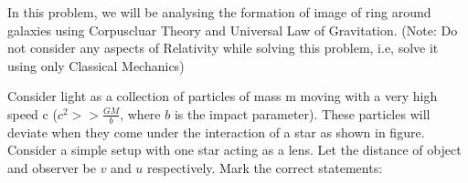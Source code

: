\documentclass[11pt,a4paper]{scrartcl}
\begin{document}
\begin{problem}

In this problem, we will be analysing the formation of image of ring around galaxies using Corpuscluar Theory and Universal Law of Gravitation. (Note: Do not consider any aspects of Relativity while solving this problem, i.e, solve it using only Classical Mechanics) 

\vspace{3mm}

Consider light as a collection of particles of mass m moving with a very high speed c ($c^2>>\frac{GM}{b}$, where $b$ is the impact parameter). These particles will deviate when they come under the interaction of a star as shown in figure. Consider a simple setup with one star acting as a lens. Let the distance of object and observer be $v$ and $u$ respectively. Mark the correct statements:


\begin{center}

\begin{tikzpicture}[x=0.75pt,y=0.75pt,yscale=-1,xscale=1]


\end{tikzpicture}
\end{center}
\end{problem}
\end{document}
